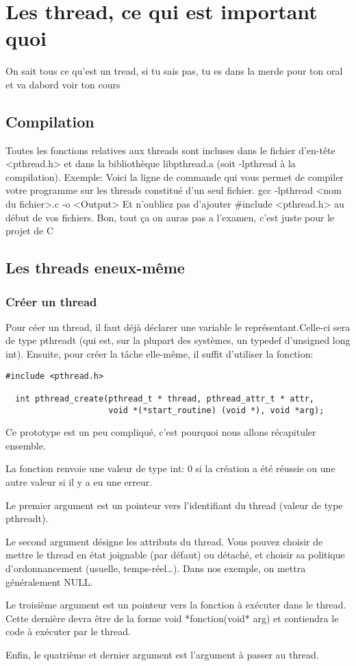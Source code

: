 \documentclass[a4paper]{article}
\begin{document}
\section{Les thread, ce qui est important quoi}
On sait tous ce qu'est un tread, si tu sais pas, tu es dans la merde pour ton oral et va dabord voir ton cours
\subsection{Compilation}
Toutes les fonctions relatives aux threads sont incluses dans le fichier d'en-tête <pthread.h> et dans la bibliothèque libpthread.a (soit -lpthread à la compilation).\newline
Exemple:\newline
Voici la ligne de commande qui vous permet de compiler votre programme sur les threads constitué d'un seul fichier.\newline
gcc -lpthread <nom du fichier>.c -o <Output>\newline
Et n'oubliez pas d'ajouter \#include <pthread.h> au début de vos fichiers.
Bon, tout ça on auras pas a l'examen, c'est juste pour le projet de C
\subsection{Les threads eneux-même}
\subsubsection{Créer un thread}
Pour céer un thread, il faut déjà déclarer une variable le représentant.Celle-ci sera de type pthread\textunderscore{}t (qui est, sur la plupart des systèmes, un typedef d'unsigned long int). Ensuite, pour créer la tâche elle-même, il suffit d'utiliser la fonction:
\begin{lstlisting}
#include <pthread.h>

  int pthread_create(pthread_t * thread, pthread_attr_t * attr,
                     void *(*start_routine) (void *), void *arg);
\end{lstlisting}
Ce prototype est un peu compliqué, c'est pourquoi nous allons récapituler ensemble.
\begin{description}
  \item La fonction renvoie une valeur de type int: 0 si la création a été réussie ou une autre valeur si il y a eu une erreur.
  \item Le premier argument est un pointeur vers l'identifiant du thread (valeur de type pthread\textunderscore{}t).
  \item Le second argument désigne les attributs du thread. Vous pouvez choisir de mettre le thread en état joignable (par défaut) ou détaché, et choisir sa politique d'ordonnancement (usuelle, temps-réel\ldots). Dans nos exemple, on mettra généralement NULL.
  \item Le troisième argument est un pointeur vers la fonction à exécuter dans le thread. Cette dernière devra être de la forme \guillemotleft{}void *fonction(void* arg)\guillemotright{} et contiendra le code à exécuter par le thread.
  \item Enfin, le quatrième et dernier argument est l'argument à passer au thread.
\end{description}
\end{document}
